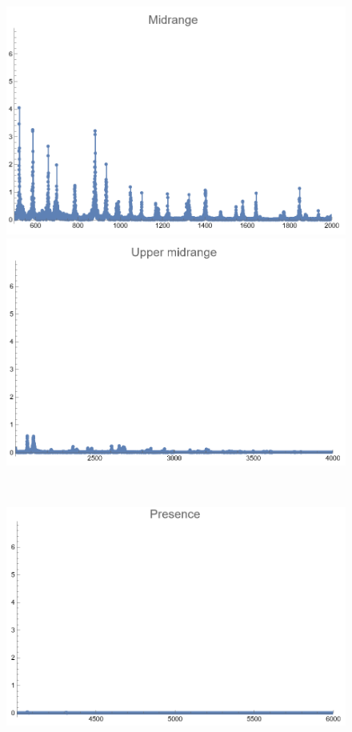 \documentclass[12pt, letterpaper]{article}
\begin{document}
\begin{figure}[H]
\begin{minipage}{.3\textwidth}
  \end{minipage}
  \begin{minipage}{0.03\textwidth}\end{minipage}
  \begin{minipage}{.3\textwidth}
    \centering
    \includegraphics[width=.9\linewidth]{imgs/Cancion3/mid.png}
  \end{minipage}
  \begin{minipage}{0.03\textwidth}\end{minipage}
  \begin{minipage}{.3\textwidth}
    \centering
    \includegraphics[width=.9\linewidth]{imgs/Cancion3/upmid.png}
  \end{minipage} \medskip \\
  \begin{minipage}{.3\textwidth}
    \centering
    \includegraphics[width=.9\linewidth]{imgs/Cancion3/presence.png}

\end{minipage}
\end{figure}
\end{document}
